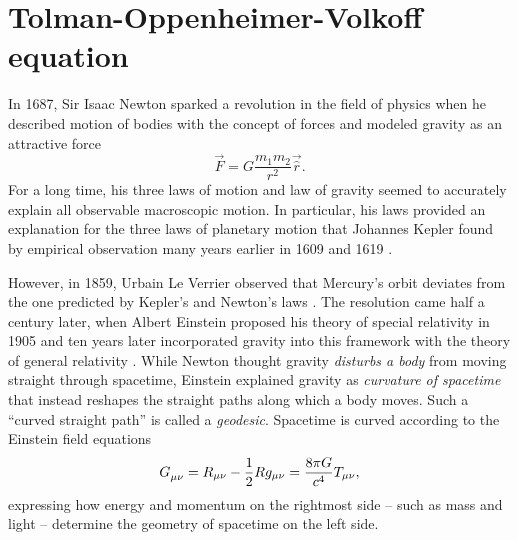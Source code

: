 \chapter{Tolman-Oppenheimer-Volkoff equation}

In 1687, Sir Isaac Newton sparked a revolution in the field of physics when he described motion of bodies with the concept of forces and modeled gravity as an attractive force
\cite{ref:newton}
\begin{equation*}
	\vec{F} = G \frac{m_1 m_2}{r^2} \vec{\hat{r}} .
\end{equation*}
For a long time, his three laws of motion and law of gravity seemed to accurately explain all observable macroscopic motion.
In particular, his laws provided an explanation for the three laws of planetary motion that Johannes Kepler found by empirical observation many years earlier in 1609 \cite{ref:kepler1} and 1619 \cite{ref:kepler2}.

However, in 1859, Urbain Le Verrier observed that Mercury's orbit deviates from the one predicted by Kepler's and Newton's laws \cite{ref:le_verrier}.
The resolution came half a century later, when Albert Einstein proposed his theory of special relativity in 1905 \cite{ref:einstein_special} and ten years later incorporated gravity into this framework with the theory of general relativity \cite{ref:einstein_general}.
While Newton thought gravity \emph{disturbs a body} from moving straight through spacetime, Einstein explained gravity as \emph{curvature of spacetime} that instead reshapes the straight paths along which a body moves.
Such a ``curved straight path'' is called a \emph{geodesic}.
Spacetime is curved according to the Einstein field equations
\begin{equation*}
	G\indices{_\mu_\nu} = R_{\mu \nu} - \frac{1}{2} R g_{\mu \nu} = \frac{8 \pi G}{c^4} T_{\mu \nu} ,
\end{equation*}
expressing how energy and momentum on the rightmost side -- such as mass and light -- determine the geometry of spacetime on the left side.

